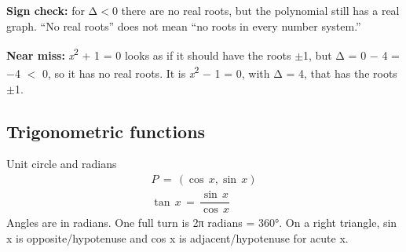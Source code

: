 \documentclass[11pt]{article}
\begin{document}
\begin{keepsection}
\begin{keepsection}
\begin{notebox}\textbf{Sign check:} for Δ\ensuremath{<}0 there are no real roots, but the polynomial still has a real graph. “No real roots” does not mean “no roots in every number system.”\end{notebox}

\begin{notebox}\textbf{Near miss:} \textit{x}\textsuperscript{2} + 1 = 0 looks as if it should have the roots \ensuremath{\pm}1, but Δ = 0 \ensuremath{-} 4 = \ensuremath{-}4 \ensuremath{<} 0, so it has no real roots. It is \textit{x}\textsuperscript{2} \ensuremath{-} 1 = 0, with Δ = 4, that has the roots \ensuremath{\pm}1.\end{notebox}
\end{keepsection}

\begin{keepsection}
\subsection{Trigonometric functions}

\begin{equationcard}{Unit circle and radians}
\[ \begin{gathered} {P}\, =\, (\cos \, {x},\sin \, {x}) \\ \tan \, {x}\, =\, \dfrac{\sin \, {x}}{\cos \, {x}} \end{gathered} \]
{\small Angles are in radians. One full turn is 2π radians = 360°. On a right triangle, sin x is opposite/hypotenuse and cos x is adjacent/hypotenuse for acute x.}
\end{equationcard}


\end{keepsection}
\end{keepsection}
\end{document}

